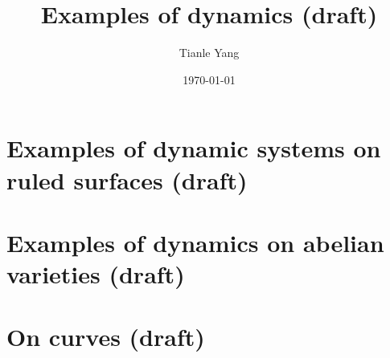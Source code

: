 \documentclass[sectionlevel=chapter]{noteformyself}
\title{Examples of dynamics (draft)}
\author{Tianle Yang}
\date{\today}
\begin{document}
    \maketitle

    \tableofcontents

    \section{Examples of dynamic systems on ruled surfaces (draft)}
    
    \section{Examples of dynamics on abelian varieties (draft)}
    
    \section{On curves (draft)}
    


    \printbibliography[heading=bibintoc, title={References}]
\end{document}
